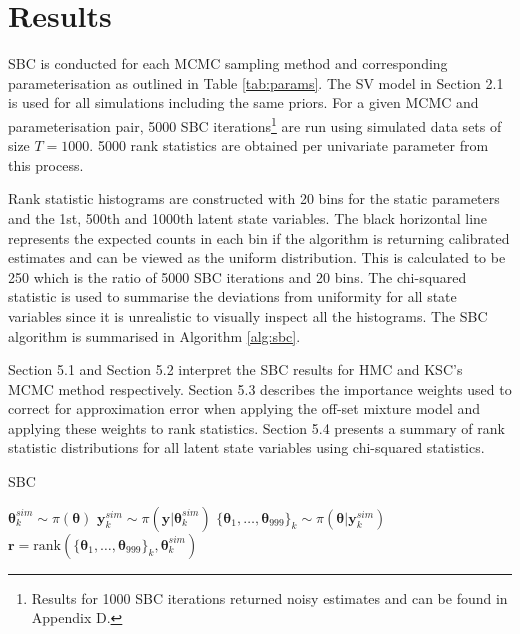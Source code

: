 \documentclass[12pt, a4paper]{article}
\begin{document}



\section{Results}
    SBC is conducted for each MCMC sampling method and corresponding parameterisation as outlined in Table \ref{tab:params}. The SV model in Section 2.1 is used for all simulations including the same priors. For a given MCMC and parameterisation pair, 5000 SBC iterations\footnote{Results for 1000 SBC iterations returned noisy estimates and can be found in Appendix D.} are run using simulated data sets of size $T=1000$. 5000 rank statistics are obtained per univariate parameter from this process. 
    
    Rank statistic histograms are constructed with 20 bins for the static parameters and the 1st, 500th and 1000th latent state variables. The black horizontal line represents the expected counts in each bin if the algorithm is returning calibrated estimates and can be viewed as the uniform distribution. This is calculated to be 250 which is the ratio of  5000 SBC iterations and 20 bins. The chi-squared statistic is used to summarise the deviations from uniformity for all state variables since it is unrealistic to visually inspect all the histograms. The SBC algorithm is summarised in Algorithm \ref{alg:sbc}.

    Section 5.1 and Section 5.2 interpret the SBC results for HMC and KSC's MCMC method respectively. Section 5.3 describes the importance weights used to correct for approximation error when applying the off-set mixture model and applying these weights to rank statistics. Section 5.4 presents a summary of rank statistic distributions for all latent state variables using chi-squared statistics. 
    
    \begin{algorithm}
        \caption{SBC}\label{alg:sbc}
        \begin{algorithmic}
                \State {} $\boldsymbol{\theta}^{sim}_k \sim\pi (\boldsymbol{\theta})$
                \State {} $\boldsymbol{y}^{sim}_k \sim \pi(\boldsymbol{y}|\boldsymbol{\theta}^{sim}_k)$
                \State {} $\{\boldsymbol{\theta}_1,\dots , \boldsymbol{\theta}_{999}\}_k \sim \pi(\boldsymbol{\theta} | \boldsymbol{y}^{sim}_k)$
                \State {} $\boldsymbol{r} = \mathrm{rank}(\{\boldsymbol{\theta}_1,\dots , \boldsymbol{\theta}_{999}\}_k, \boldsymbol{\theta}^{sim}_k)$
              \EndFor
        \end{algorithmic}
        \end{algorithm}
        
\end{document}
